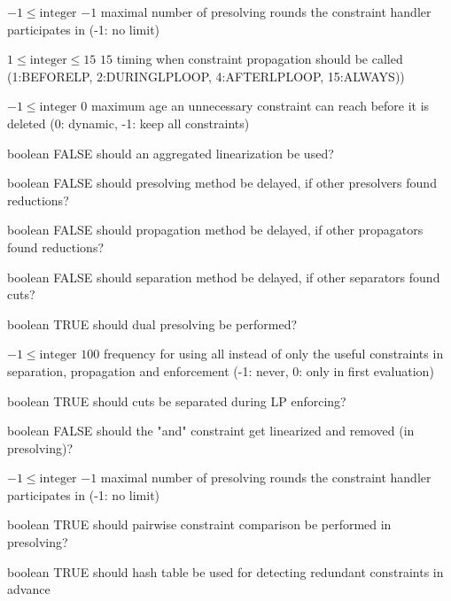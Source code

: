 %
{$-1\leq\textrm{integer}$}%
{$-1$}%
{maximal number of presolving rounds the constraint handler participates in (-1: no limit)}%
{}

%
{$1\leq\textrm{integer}\leq15$}%
{$15$}%
{timing when constraint propagation should be called (1:BEFORELP, 2:DURINGLPLOOP, 4:AFTERLPLOOP, 15:ALWAYS))}%
{}

%
{$-1\leq\textrm{integer}$}%
{$0$}%
{maximum age an unnecessary constraint can reach before it is deleted (0: dynamic, -1: keep all constraints)}%
{}

%
{boolean}%
{FALSE}%
{should an aggregated linearization be used?}%
{}

%
{boolean}%
{FALSE}%
{should presolving method be delayed, if other presolvers found reductions?}%
{}

%
{boolean}%
{FALSE}%
{should propagation method be delayed, if other propagators found reductions?}%
{}

%
{boolean}%
{FALSE}%
{should separation method be delayed, if other separators found cuts?}%
{}

%
{boolean}%
{TRUE}%
{should dual presolving be performed?}%
{}

%
{$-1\leq\textrm{integer}$}%
{$100$}%
{frequency for using all instead of only the useful constraints in separation, propagation and enforcement (-1: never, 0: only in first evaluation)}%
{}

%
{boolean}%
{TRUE}%
{should cuts be separated during LP enforcing?}%
{}

%
{boolean}%
{FALSE}%
{should the "and" constraint get linearized and removed (in presolving)?}%
{}

%
{$-1\leq\textrm{integer}$}%
{$-1$}%
{maximal number of presolving rounds the constraint handler participates in (-1: no limit)}%
{}

%
{boolean}%
{TRUE}%
{should pairwise constraint comparison be performed in presolving?}%
{}

%
{boolean}%
{TRUE}%
{should hash table be used for detecting redundant constraints in advance}%
{}

